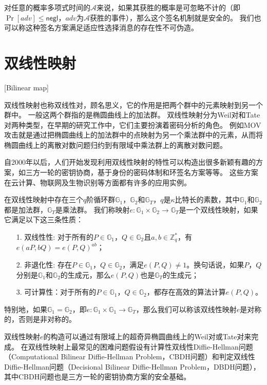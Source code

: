 对任意的概率多项式时间的$\mathcal{A}$来说，如果其获胜的概率是可忽略不计的（即$\Pr[adv]\leq\mathsf{negl}$，$adv$为$\mathcal{A}$获胜的事件），那么这个签名机制就是安全的。
我们也可以称这种签名方案满足适应性选择消息的存在性不可伪造。

\section{双线性映射}[Bilinear map]

双线性映射也称双线性对，顾名思义，它的作用是把两个群中的元素映射到另一个群中\cite{张方国2016从双线性对到多线性映射}。
一般这两个群指的是椭圆曲线上的加法群。
双线性映射分为Weil对和Tate对两种类型，在早期的研究工作中，它们主要扮演着密码分析的角色。
例如MOV攻击就是通过把椭圆曲线上的加法群中的点映射为另一个乘法群中的元素，从而将椭圆曲线上的离散对数问题归约到有限域中乘法群上的离散对数问题。

自2000年以后，人们开始发现利用双线性映射的特性可以构造出很多新颖有趣的方案，如三方一轮的密钥协商\cite{joux2000one}，基于身份的密码体制\cite{boneh2001identity}和环签名\cite{chow2005efficient}方案等等。
这些方案在云计算、物联网及生物识别等方面都有许多的应用实例。

在双线性映射中存在三个$q$阶循环群$\mathbb{G}_1$，$\mathbb{G}_2$和$\mathbb{G}_T$，$q$是$\kappa$比特长的素数，其中$\mathbb{G}_1$和$\mathbb{G}_2$都是加法群，$\mathbb{G}_T$是乘法群。
我们称映射$e:\mathbb{G}_1\times\mathbb{G}_2\rightarrow \mathbb{G}_T$是一个双线性映射，如果它满足以下这三条性质：
\begin{itemize}
  \item[1.] 双线性性: 对于所有的$P\in \mathbb{G}_1$，$Q\in \mathbb{G}_2$且$a,b\in\mathbb{Z}_q^*$，有$e(aP,bQ)=e(P,Q)^{ab}$；
  \item[2.] 非退化性: 存在$P\in \mathbb{G}_1$，$Q\in \mathbb{G}_2$，满足$e(P,Q)\neq1$。换句话说，如果$P$，$Q$分别是$\mathbb{G}_1$和$\mathbb{G}_2$的生成元，那么$e(P,Q)$也是$\mathbb{G}_T$的生成元；
  \item[3.] 可计算性：对于所有的$P\in\mathbb{G}_1$，$Q\in\mathbb{G}_2$，都存在高效的算法计算$e(P,Q)$。  
\end{itemize}
特别地，如果$\mathbb{G}_1=\mathbb{G}_2$，即$e:\mathbb{G}_1\times \mathbb{G}_1\rightarrow \mathbb{G}_T$，那么我们可以称该双线性映射$e$是对称的，否则是非对称的。

双线性映射$e$的构造可以通过有限域上的超奇异椭圆曲线上的Weil对或Tate对来完成。
在双线性映射上最常见的困难问题假设有计算性双线性Diffie-Hellman问题（Computational Bilinear Diffie-Hellman Problem，CBDH问题）和判定双线性Diffie-Hellman问题（Decisional Bilinear Diffie-Hellman Problem，DBDH问题），其中CBDH问题也是三方一轮的密钥协商方案的安全基础\cite{joux2000one}。

